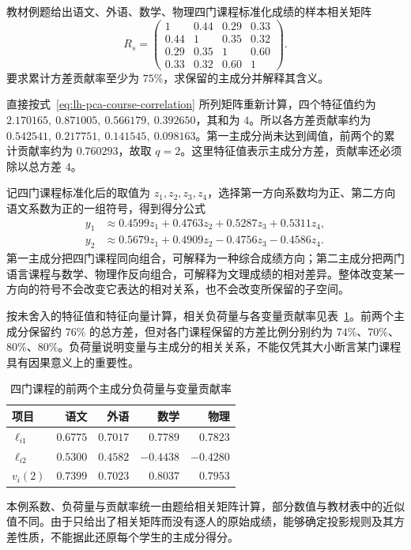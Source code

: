 \begin{example}
\label{ex:lh-pca-four-courses}
教材例题给出语文、外语、数学、物理四门课程标准化成绩的样本相关矩阵
\begin{equation}
R_s=\begin{pmatrix}
1&0.44&0.29&0.33\\
0.44&1&0.35&0.32\\
0.29&0.35&1&0.60\\
0.33&0.32&0.60&1
\end{pmatrix}.
\label{eq:lh-pca-course-correlation}
\end{equation}
要求累计方差贡献率至少为 $75\%$，求保留的主成分并解释其含义。
\end{example}
\begin{solve}
直接按式~\eqref{eq:lh-pca-course-correlation} 所列矩阵重新计算，四个特征值约为 $2.170165,\ 0.871005,\ 0.566179,\ 0.392650$，其和为 $4$。所以各方差贡献率约为 $0.542541,\ 0.217751,\ 0.141545,\ 0.098163$。第一主成分尚未达到阈值，前两个的累计贡献率约为 $0.760293$，故取 $q=2$。这里特征值表示主成分方差，贡献率还必须除以总方差 $4$。

记四门课程标准化后的取值为 $z_1,z_2,z_3,z_4$，选择第一方向系数均为正、第二方向语文系数为正的一组符号，得到得分公式
\begin{align*}
y_1&\approx0.4599z_1+0.4763z_2+0.5287z_3+0.5311z_4,\\
y_2&\approx0.5679z_1+0.4909z_2-0.4756z_3-0.4586z_4.
\end{align*}
第一主成分把四门课程同向组合，可解释为一种综合成绩方向；第二主成分把两门语言课程与数学、物理作反向组合，可解释为文理成绩的相对差异。整体改变某一方向的符号不会改变它表达的相对关系，也不会改变所保留的子空间。

按未舍入的特征值和特征向量计算，相关负荷量与各变量贡献率见表~\ref{tab:lh-pca-course-loadings}。前两个主成分保留约 $76\%$ 的总方差，但对各门课程保留的方差比例分别约为 $74\%$、$70\%$、$80\%$、$80\%$。负荷量说明变量与主成分的相关关系，不能仅凭其大小断言某门课程具有因果意义上的重要性。
\begin{table}
\centering
\caption{四门课程的前两个主成分负荷量与变量贡献率}
\label{tab:lh-pca-course-loadings}
\begin{tabular}{lrrrr}
\toprule
项目 & 语文 & 外语 & 数学 & 物理\\
\midrule
$\ell_{i1}$ & $0.6775$ & $0.7017$ & $0.7789$ & $0.7823$\\
$\ell_{i2}$ & $0.5300$ & $0.4582$ & $-0.4438$ & $-0.4280$\\
$v_i(2)$ & $0.7399$ & $0.7023$ & $0.8037$ & $0.7953$\\
\bottomrule
\end{tabular}
\end{table}
本例系数、负荷量与贡献率统一由题给相关矩阵计算，部分数值与教材表中的近似值不同。由于只给出了相关矩阵而没有逐人的原始成绩，能够确定投影规则及其方差性质，不能据此还原每个学生的主成分得分。
\end{solve}

